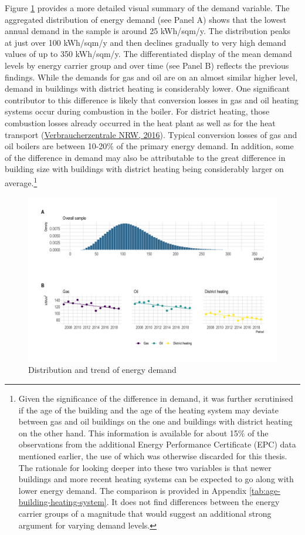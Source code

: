 \documentclass[12pt,twoside]{reedthesis}
\begin{document}
Figure \ref{fig:demand-descriptive-graph} provides a more detailed visual summary of the demand variable. The aggregated distribution of energy demand (see Panel A) shows that the lowest annual demand in the sample is around 25 kWh/sqm/y. The distribution peaks at just over 100 kWh/sqm/y and then declines gradually to very high demand values of up to 350 kWh/sqm/y. The differentiated display of the mean demand levels by energy carrier group and over time (see Panel B) reflects the previous findings. While the demands for gas and oil are on an almost similar higher level, demand in buildings with district heating is considerably lower. One significant contributor to this difference is likely that conversion losses in gas and oil heating systems occur during combustion in the boiler. For district heating, those combustion losses already occurred in the heat plant as well as for the heat transport (\protect\hyperlink{ref-verbraucherzentralenrw16}{Verbraucherzentrale NRW, 2016}). Typical conversion losses of gas and oil boilers are between 10-20\% of the primary energy demand. In addition, some of the difference in demand may also be attributable to the great difference in building size with buildings with district heating being considerably larger on average.\footnote{Given the significance of the difference in demand, it was further scrutinised if the age of the building and the age of the heating system may deviate between gas and oil buildings on the one and buildings with district heating on the other hand. This information is available for about 15\% of the observations from the additional Energy Performance Certificate (EPC) data mentioned earlier, the use of which was otherwise discarded for this thesis. The rationale for looking deeper into these two variables is that newer buildings and more recent heating systems can be expected to go along with lower energy demand. The comparison is provided in Appendix \ref{tab:age-building-heating-system}. It does not find differences between the energy carrier groups of a magnitude that would suggest an additional strong argument for varying demand levels.}
\begin{figure}

{\centering \includegraphics[width=1\linewidth]{figure/demand_descriptive} 

}

\caption{Distribution and trend of energy demand}\label{fig:demand-descriptive-graph}
\end{figure}
\end{document}
